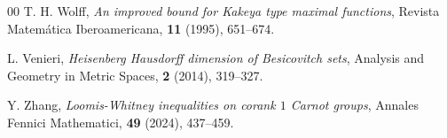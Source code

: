 \documentclass[11pt]{article}
\newcommand{\1}{\mathbf 1}
\begin{document}
\begin{thebibliography}{00}
T. H. Wolff, \textit{An improved bound for Kakeya type maximal functions},
Revista Matem\'atica Iberoamericana, \textbf{11} (1995), 651--674.

L. Venieri, \textit{Heisenberg Hausdorff dimension of Besicovitch sets},
Analysis and Geometry in Metric Spaces, \textbf{2} (2014), 319--327.

Y. Zhang, \textit{Loomis-Whitney inequalities on corank $1$ Carnot groups}, Annales Fennici Mathematici, \textbf{49} (2024), 437--459.

\end{thebibliography}
\end{document}
